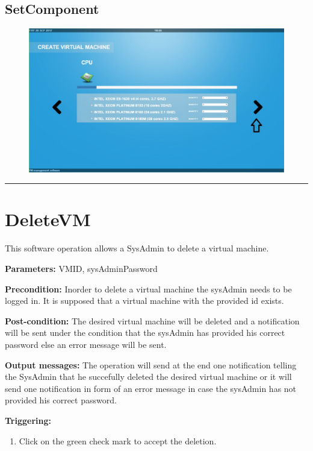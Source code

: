 \subsection{SetComponent}

\begin{figure}[H]
\centering
\includegraphics[width=170mm]{images/softAvailable.eps}
\caption{\label{overflow}}
\end{figure}


\hrule
\vspace{0.5cm}







\section{DeleteVM}
\label{operation:DeleteVM}
This software operation allows a SysAdmin to delete a virtual machine. 
\begin{description}

\item \textbf{Parameters:} VMID, sysAdminPassword
\item \textbf{Precondition:} Inorder to delete a virtual machine the sysAdmin
needs to be logged in. It is supposed that a virtual machine with the provided
id exists.

\item \textbf{Post-condition:} The desired virtual machine will be deleted and a
notification will be sent under the condition that the sysAdmin has provided his
correct password else an error message will be sent.
\item \textbf{Output messages:} The operation will send at the end one
notification telling the SysAdmin that he succefully deleted the desired
virtual machine or it will send one notification in form of an error message in
case the sysAdmin has not provided his correct password.

\item \textbf{Triggering:}
\begin{enumerate}
\item Click on the green check mark to accept the deletion.
\end{enumerate}

 
\end{description}

